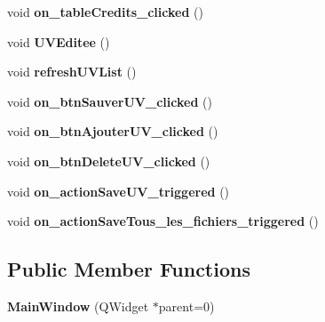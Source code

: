 \begin{DoxyCompactItemize}
\item 
\hypertarget{class_main_window_a6b9781cf986867f8937450a59c3be108}{void {\bfseries on\+\_\+table\+Credits\+\_\+clicked} ()}\label{class_main_window_a6b9781cf986867f8937450a59c3be108}

\item 
\hypertarget{class_main_window_a584c187beaa5a10db5a0a0dcf23bb94a}{void {\bfseries U\+V\+Editee} ()}\label{class_main_window_a584c187beaa5a10db5a0a0dcf23bb94a}

\item 
\hypertarget{class_main_window_a19a34bba77b784a84a5e1ddc02b070c5}{void {\bfseries refresh\+U\+V\+List} ()}\label{class_main_window_a19a34bba77b784a84a5e1ddc02b070c5}

\item 
\hypertarget{class_main_window_a99ae5b77512a4af864c7a3978a2e9c68}{void {\bfseries on\+\_\+btn\+Sauver\+U\+V\+\_\+clicked} ()}\label{class_main_window_a99ae5b77512a4af864c7a3978a2e9c68}

\item 
\hypertarget{class_main_window_a08296ae696d74f8608b443e7f518bc2b}{void {\bfseries on\+\_\+btn\+Ajouter\+U\+V\+\_\+clicked} ()}\label{class_main_window_a08296ae696d74f8608b443e7f518bc2b}

\item 
\hypertarget{class_main_window_ad62fa3cd85fdb2b06723f609809df5a1}{void {\bfseries on\+\_\+btn\+Delete\+U\+V\+\_\+clicked} ()}\label{class_main_window_ad62fa3cd85fdb2b06723f609809df5a1}

\item 
\hypertarget{class_main_window_af90c95ef7c164471f5901371da6e5dda}{void {\bfseries on\+\_\+action\+Save\+U\+V\+\_\+triggered} ()}\label{class_main_window_af90c95ef7c164471f5901371da6e5dda}

\item 
\hypertarget{class_main_window_a42052ea3e95394a8de3b2763047aefaa}{void {\bfseries on\+\_\+action\+Save\+Tous\+\_\+les\+\_\+fichiers\+\_\+triggered} ()}\label{class_main_window_a42052ea3e95394a8de3b2763047aefaa}

\end{DoxyCompactItemize}
\subsection*{Public Member Functions}
\begin{DoxyCompactItemize}
\item 
\hypertarget{class_main_window_a8b244be8b7b7db1b08de2a2acb9409db}{{\bfseries Main\+Window} (Q\+Widget $\ast$parent=0)}\label{class_main_window_a8b244be8b7b7db1b08de2a2acb9409db}

\end{DoxyCompactItemize}

